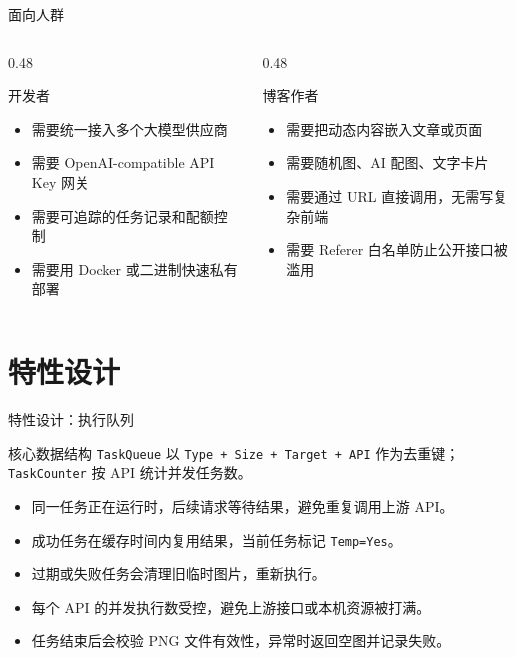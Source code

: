 \documentclass[aspectratio=169,UTF8]{ctexbeamer}
\newcommand{\code}[1]{\texttt{#1}}
\begin{document}
\begin{frame}{面向人群}
  \begin{columns}[T]
    \begin{column}{0.48\linewidth}
      \begin{block}{开发者}
        \begin{itemize}
          \item 需要统一接入多个大模型供应商
          \item 需要 OpenAI-compatible API Key 网关
          \item 需要可追踪的任务记录和配额控制
          \item 需要用 Docker 或二进制快速私有部署
        \end{itemize}
      \end{block}
    \end{column}
    \begin{column}{0.48\linewidth}
      \begin{block}{博客作者}
        \begin{itemize}
          \item 需要把动态内容嵌入文章或页面
          \item 需要随机图、AI 配图、文字卡片
          \item 需要通过 URL 直接调用，无需写复杂前端
          \item 需要 Referer 白名单防止公开接口被滥用
        \end{itemize}
      \end{block}
    \end{column}
  \end{columns}
\end{frame}

\section{特性设计}

\begin{frame}{特性设计：执行队列}
  \begin{block}{核心数据结构}
    \code{TaskQueue} 以 \code{Type + Size + Target + API} 作为去重键；\code{TaskCounter} 按 API 统计并发任务数。
  \end{block}

  \begin{itemize}
    \item 同一任务正在运行时，后续请求等待结果，避免重复调用上游 API。
    \item 成功任务在缓存时间内复用结果，当前任务标记 \code{Temp=Yes}。
    \item 过期或失败任务会清理旧临时图片，重新执行。
    \item 每个 API 的并发执行数受控，避免上游接口或本机资源被打满。
    \item 任务结束后会校验 PNG 文件有效性，异常时返回空图并记录失败。
  \end{itemize}
\end{frame}
\end{document}
